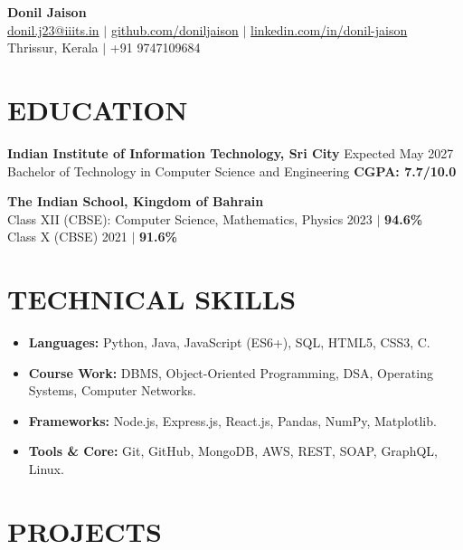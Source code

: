 \documentclass[a4paper,10pt]{article}
\begin{document}
\begin{center}
    {\LARGE \textbf{Donil Jaison}} \\
    \vspace{3pt}
    \href{mailto:donil.j23@iiits.in}{donil.j23@iiits.in} $|$ \href{https://github.com/doniljaison}{github.com/doniljaison} $|$ \href{https://linkedin.com/in/donil-jaison-93a17428a}{linkedin.com/in/donil-jaison} \\
    Thrissur, Kerala $|$ +91 9747109684
\end{center}

\vspace{-5pt}

\section*{EDUCATION}
\noindent\textbf{Indian Institute of Information Technology, Sri City} \hfill Expected May 2027 \\
Bachelor of Technology in Computer Science and Engineering \hfill \textbf{CGPA: 7.7/10.0} \\
\vspace{6pt}

\noindent\textbf{The Indian School, Kingdom of Bahrain} \\
Class XII (CBSE): Computer Science, Mathematics, Physics \hfill 2023 $|$ \textbf{94.6\%} \\
Class X (CBSE) \hfill 2021 $|$ \textbf{91.6\%}

\section*{TECHNICAL SKILLS}
\begin{itemize}
    \item \textbf{Languages:} Python, Java, JavaScript (ES6+), SQL, HTML5, CSS3, C.
    \item \textbf{Course Work:} DBMS, Object-Oriented Programming, DSA, Operating Systems, Computer Networks.
    \item \textbf{Frameworks:} Node.js, Express.js, React.js, Pandas, NumPy, Matplotlib.
    \item \textbf{Tools \& Core:} Git, GitHub, MongoDB, AWS, REST, SOAP, GraphQL, Linux.
\end{itemize}

\section*{PROJECTS}
\end{document}

